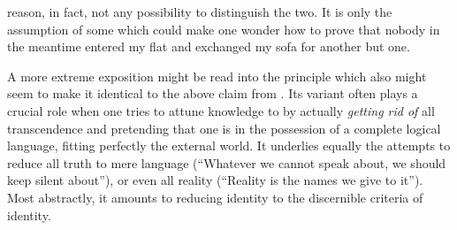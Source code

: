 reason, in fact, not any possibility to distinguish the two. It is only the
assumption of some  which could make one wonder
how to prove that nobody in the meantime entered my flat and exchanged my sofa
for another but  one.

\pa\label{pa:distLang} A more extreme exposition might be read into the
principle which also might seem to make it identical to the above claim from
.  Its variant often plays a crucial role when one tries to
attune knowledge to  by actually {\em getting rid of} all
transcendence and pretending that one is in the possession of a complete logical
language, fitting perfectly the external world.  It underlies equally the
attempts to reduce all truth to mere language (``Whatever we cannot speak about,
we should keep silent about''), or even all reality (``Reality is the names we
give to it''). Most abstractly, it amounts to reducing identity to the
 discernible criteria of identity.


